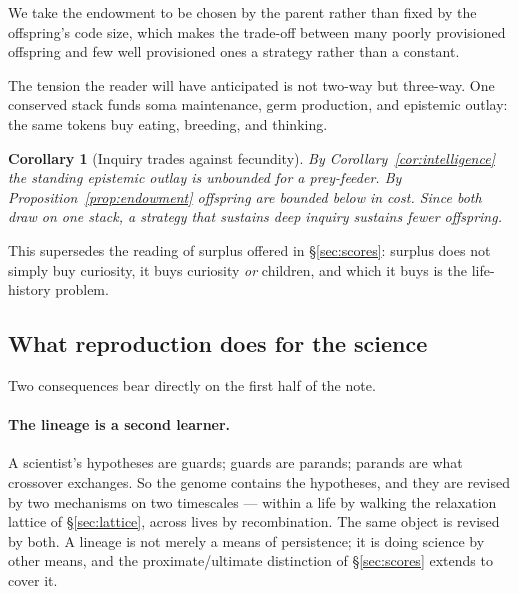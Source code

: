\documentclass[11pt]{article}
\theoremstyle{plain}
\newtheorem{corollary}[theorem]{Corollary}
\theoremstyle{definition}
\begin{document}
We take the endowment to be chosen by the parent rather than fixed by the offspring's code size, which
makes the trade-off between many poorly provisioned offspring and few well provisioned ones a strategy
rather than a constant.

The tension the reader will have anticipated is not two-way but three-way. One conserved stack funds
soma maintenance, germ production, and epistemic outlay: the same tokens buy eating, breeding, and
thinking.

\begin{corollary}[Inquiry trades against fecundity]
\label{cor:kselection}
By Corollary~\ref{cor:intelligence} the standing epistemic outlay is unbounded for a prey-feeder. By
Proposition~\ref{prop:endowment} offspring are bounded below in cost. Since both draw on one stack,
a strategy that sustains deep inquiry sustains fewer offspring.
\end{corollary}

This supersedes the reading of surplus offered in \S\ref{sec:scores}: surplus does not simply buy
curiosity, it buys curiosity \emph{or} children, and which it buys is the life-history problem.

\subsection{What reproduction does for the science}

Two consequences bear directly on the first half of the note.

\paragraph{The lineage is a second learner.} A scientist's hypotheses are guards; guards are parands;
parands are what crossover exchanges. So the genome contains the hypotheses, and they are revised by
two mechanisms on two timescales --- within a life by walking the relaxation lattice of
\S\ref{sec:lattice}, across lives by recombination. The same object is revised by both. A lineage is
not merely a means of persistence; it is doing science by other means, and the proximate/ultimate
distinction of \S\ref{sec:scores} extends to cover it.
\end{document}
